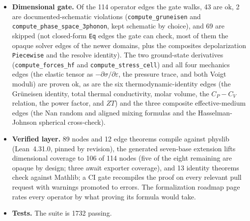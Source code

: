 \documentclass[11pt,a4paper]{article}
\begin{document}
\begin{itemize}[leftmargin=2em, itemsep=0.25em]
        studies, PtSe$_2$ 2021, quantum-elastic PIMD/TDEP 2024, SiGe disorder
        2024, amorphous alloys 2020, and the Balandin 2008 graphene
        measurement). The four measurements are the Glassbrenner--Slack 1964
        steady-state thermal conductivities of bulk single-crystal silicon
        ($156\,\mathrm{W/(m\,K)}$) and germanium ($60.2\,\mathrm{W/(m\,K)}$) at
        $300\,\mathrm{K}$ and natural isotopic abundance, the Balandin 2008
        suspended-graphene Raman value, and the PtSe$_2$ 2021 in-plane FDTR
        value. The four newest
        simulation values (2026-07-18) are fully-specified engine-adapter
        evidence: kaldo and phono3py silicon thermal conductivities, RTA and
        direct-inverse, with every knob in-hash down to the sha256 of the
        vendored Tersoff potential, each paired with a committed conformance
        target (eight targets total) that a re-run must reproduce within its
        stated tolerance.
  \item \textbf{Dimensional gate.} Of the 114 operator edges the gate walks, 43
        are ok, 2 are documented-schematic violations
        (\texttt{compute\_gruneisen} and \texttt{compute\_phase\_space\_3phonon},
        kept schematic by choice), and 69 are skipped (not closed-form
        \texttt{Eq} edges the gate can check, most of them the opaque solver
        edges of the newer domains, plus the composites depolarization
        \texttt{Piecewise} and the resolve identity). The two ground-state
        derivatives
        (\texttt{compute\_forces\_hf} and \texttt{compute\_stress\_cell}) and all
        four mechanics edges (the elastic tensor as
        $-\partial\sigma/\partial\varepsilon$, the pressure trace, and both Voigt
        moduli) are proven ok, as are the six thermodynamic-identity edges (the
        Gr\"uneisen identity, total thermal conductivity, molar volume, the
        $C_P - C_V$ relation, the power factor, and $ZT$) and the three composite
        effective-medium edges (the Nan random and aligned mixing formulas and
        the Hasselman-Johnson spherical cross-check).
  \item \textbf{Verified layer.} 89 nodes and 12 edge theorems compile against
        physlib (Lean~4.31.0, pinned by revision), the generated seven-base
        extension lifts dimensional coverage to 106 of 114 nodes (five of the
        eight remaining are opaque by design; three await exporter coverage),
        and 13 identity theorems check against
        Mathlib; a CI gate recompiles the proof on every relevant pull request
        with warnings promoted to errors. The formalization roadmap page rates
        every operator by what proving its formula would take.
  \item \textbf{Tests.} The suite is 1732 passing.
\end{itemize}
\end{document}
